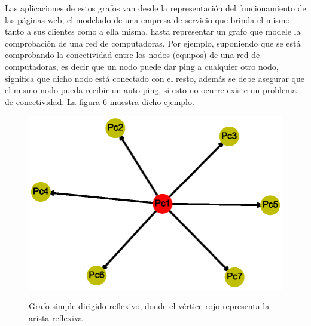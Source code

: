 \documentclass{article}
\begin{document}
Las aplicaciones de estos grafos van desde la representación del funcionamiento de las páginas web, el modelado de una empresa de servicio que brinda el mismo tanto a sus clientes como a ella misma, hasta representar un grafo que modele la comprobación de una red de computadoras. 
Por ejemplo, suponiendo que se está comprobando la conectividad entre los nodos (equipos) de una red de computadoras, es decir que un nodo puede dar ping a cualquier otro nodo, significa que dicho nodo está conectado con el resto, además se debe asegurar que el mismo nodo pueda recibir un auto-ping, si esto no ocurre existe un problema de conectividad. La figura 6 muestra dicho ejemplo.

\begin{center}

\end{center}
\begin{figure}[h]
\begin{center}
\includegraphics[scale=0.7]{Graf6.eps}\\
\caption{Grafo simple dirigido reflexivo, donde el vértice rojo representa la arista reflexiva}
\end{center}
\end{figure}
\end{document}
